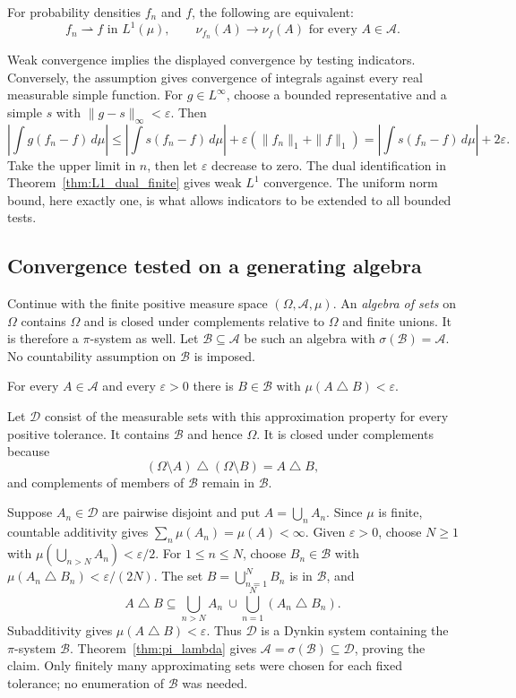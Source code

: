 \begin{proposition}
For probability densities $f_n$ and $f$, the following are equivalent:
\[
f_n\rightharpoonup f\text{ in }L^1(\mu),
\qquad
\nu_{f_n}(A)\longrightarrow\nu_f(A)
\text{ for every }A\in\mathcal A.
\]
\end{proposition}
\Proof
Weak convergence implies the displayed convergence by testing indicators.
Conversely, the assumption gives convergence of integrals against every
real measurable simple function. For $g\in L^\infty$, choose a bounded
representative and a simple $s$ with $\|g-s\|_\infty<\varepsilon$.
Then
\[
\left|\int g(f_n-f)\,d\mu\right|
\leq\left|\int s(f_n-f)\,d\mu\right|
 +\varepsilon(\|f_n\|_1+\|f\|_1)
=\left|\int s(f_n-f)\,d\mu\right|+2\varepsilon.
\]
Take the upper limit in $n$, then let $\varepsilon$ decrease to zero.
The dual identification in Theorem~\ref{thm:L1_dual_finite} gives weak
$L^1$ convergence. The uniform norm bound, here exactly one, is what
allows indicators to be extended to all bounded tests.
\Done

\subsection{Convergence tested on a generating algebra}
Continue with the finite positive measure space
$(\Omega,\mathcal A,\mu)$. An \emph{algebra of sets} on $\Omega$
contains $\Omega$ and is closed under complements relative to
$\Omega$ and finite unions. It is therefore a $\pi$-system as well.
Let $\mathcal B\subseteq\mathcal A$ be such an algebra with
$\sigma(\mathcal B)=\mathcal A$. No countability assumption on
$\mathcal B$ is imposed.

\begin{lemma}
\label{lem:algebra_measure_approximation}
For every $A\in\mathcal A$ and every $\varepsilon>0$ there is
$B\in\mathcal B$ with $\mu(A\mathbin\triangle B)<\varepsilon$.
\end{lemma}
\Proof
Let $\mathcal D$ consist of the measurable sets with this approximation
property for every positive tolerance. It contains $\mathcal B$ and
hence $\Omega$. It is closed under complements because
\[
(\Omega\setminus A)\mathbin\triangle(\Omega\setminus B)
=A\mathbin\triangle B,
\]
and complements of members of $\mathcal B$ remain in $\mathcal B$.

Suppose $A_n\in\mathcal D$ are pairwise disjoint and put
$A=\bigcup_nA_n$. Since $\mu$ is finite, countable additivity gives
$\sum_n\mu(A_n)=\mu(A)<\infty$. Given $\varepsilon>0$, choose
$N\geq1$ with $\mu(\bigcup_{n>N}A_n)<\varepsilon/2$.
For $1\leq n\leq N$, choose $B_n\in\mathcal B$ with
$\mu(A_n\mathbin\triangle B_n)<\varepsilon/(2N)$.
The set $B=\bigcup_{n=1}^N B_n$ is in $\mathcal B$, and
\[
A\mathbin\triangle B
\subseteq\bigcup_{n>N}A_n\ \cup
          \bigcup_{n=1}^N(A_n\mathbin\triangle B_n).
\]
Subadditivity gives $\mu(A\mathbin\triangle B)<\varepsilon$.
Thus $\mathcal D$ is a Dynkin system containing the $\pi$-system
$\mathcal B$. Theorem~\ref{thm:pi_lambda} gives
$\mathcal A=\sigma(\mathcal B)\subseteq\mathcal D$, proving the
claim. Only finitely many approximating sets were chosen for each
fixed tolerance; no enumeration of $\mathcal B$ was needed.
\Done

